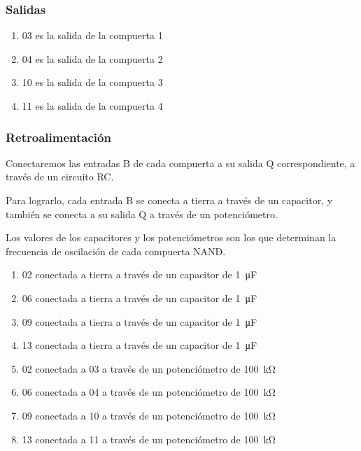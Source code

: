 \documentclass[../principal.tex]{subfiles}
\begin{document}
\subsubsection{Salidas}

\begin{enumerate}
    \item 03 es la salida de la compuerta 1
    \item 04 es la salida de la compuerta 2
    \item 10 es la salida de la compuerta 3
    \item 11 es la salida de la compuerta 4
\end{enumerate}

\subsubsection{Retroalimentación}

Conectaremos las entradas B de cada compuerta a su salida Q correspondiente, a través de un circuito RC.

Para lograrlo, cada entrada B se conecta a tierra a través de un capacitor, y también se conecta a su salida Q a través de un potenciómetro.

Los valores de los capacitores y los potenciómetros son los que determinan la frecuencia de oscilación de cada compuerta NAND.

\begin{enumerate}
    \item 02 conectada a tierra a través de un capacitor de \qty{1}{\micro\farad}
    \item 06 conectada a tierra a través de un capacitor de \qty{1}{\micro\farad}
    \item 09 conectada a tierra a través de un capacitor de \qty{1}{\micro\farad}
    \item 13 conectada a tierra a través de un capacitor de \qty{1}{\micro\farad}
    \item 02 conectada a 03 a través de un potenciómetro de \qty{100}{\kilo\ohm}
    \item 06 conectada a 04 a través de un potenciómetro de \qty{100}{\kilo\ohm}
    \item 09 conectada a 10 a través de un potenciómetro de \qty{100}{\kilo\ohm}
    \item 13 conectada a 11 a través de un potenciómetro de \qty{100}{\kilo\ohm}
\end{enumerate}

\newpage
\end{document}
